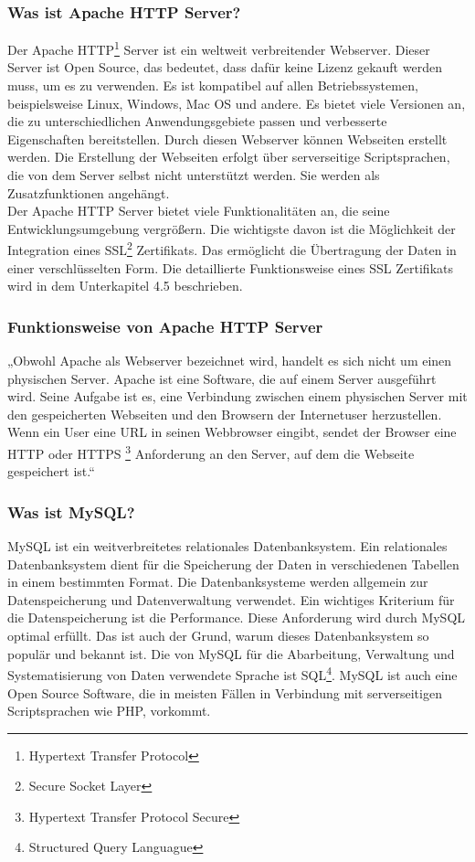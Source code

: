 \subsubsection{Was ist Apache HTTP Server?} 
Der Apache HTTP\footnote{Hypertext Transfer Protocol} Server ist ein weltweit verbreitender Webserver. Dieser Server ist Open Source, das bedeutet, dass dafür keine Lizenz gekauft werden muss, um es zu verwenden. Es ist kompatibel auf allen Betriebssystemen, beispielsweise Linux, Windows, Mac OS und andere. Es bietet viele Versionen an, die zu unterschiedlichen Anwendungsgebiete passen und verbesserte Eigenschaften bereitstellen. Durch diesen Webserver können Webseiten erstellt werden. Die Erstellung der Webseiten erfolgt über serverseitige Scriptsprachen, die von dem Server selbst nicht unterstützt werden. Sie werden als Zusatzfunktionen angehängt. \\
Der Apache HTTP Server bietet viele Funktionalitäten an, die seine Entwicklungsumgebung vergrößern. Die wichtigste davon ist die Möglichkeit der Integration eines SSL\footnote{Secure Socket Layer} Zertifikats. Das ermöglicht die Übertragung der Daten in einer verschlüsselten Form. Die detaillierte Funktionsweise eines SSL Zertifikats wird in dem Unterkapitel 4.5 beschrieben.  \cite{50_apache}
\subsubsection{Funktionsweise von Apache HTTP Server} 
„Obwohl Apache als Webserver bezeichnet wird, handelt es sich nicht um einen physischen Server. Apache ist eine Software, die auf einem Server ausgeführt wird. Seine Aufgabe ist es, eine Verbindung zwischen einem physischen Server mit den gespeicherten Webseiten und den Browsern der Internetuser herzustellen. \\
Wenn ein User eine URL in seinen Webbrowser eingibt, sendet der Browser eine HTTP oder HTTPS \footnote{Hypertext Transfer Protocol Secure} Anforderung an den Server, auf dem die Webseite gespeichert ist.“ \cite{50_apache} \\

\subsubsection{Was ist MySQL?} 
MySQL ist ein weitverbreitetes relationales Datenbanksystem. Ein relationales Datenbanksystem dient für die Speicherung der Daten in verschiedenen Tabellen in einem bestimmten Format. Die Datenbanksysteme werden allgemein zur Datenspeicherung und Datenverwaltung verwendet. Ein wichtiges Kriterium für die Datenspeicherung ist die Performance. Diese Anforderung wird durch MySQL optimal erfüllt. Das ist auch der Grund, warum dieses Datenbanksystem so populär und bekannt ist. Die von MySQL für die Abarbeitung, Verwaltung und Systematisierung von Daten verwendete Sprache ist SQL\footnote{Structured Query Languague}. MySQL ist auch eine Open Source Software,
die in meisten Fällen in Verbindung mit serverseitigen Scriptsprachen wie PHP, vorkommt. \cite{50_mysql}
